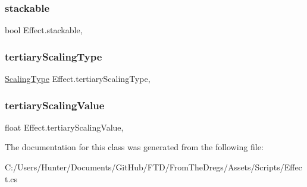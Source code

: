 \mbox{\label{class_effect_a38b8b477fdedcf31c0aea3ecdc64c0c9}} 
\subsubsection{\texorpdfstring{stackable}{stackable}}
{\footnotesize\ttfamily bool Effect.\+stackable\hspace{0.3cm}{\ttfamily [get]}, {\ttfamily [set]}}

\mbox{\label{class_effect_af01f4eaea6040a558e1f3369e28f6bb2}} 
\subsubsection{\texorpdfstring{tertiaryScalingType}{tertiaryScalingType}}
{\footnotesize\ttfamily \mbox{\hyperlink{class_effect_af0ada789de40f58c24c46bf8ed2f300c}{Scaling\+Type}} Effect.\+tertiary\+Scaling\+Type\hspace{0.3cm}{\ttfamily [get]}, {\ttfamily [set]}}

\mbox{\label{class_effect_a92631b7dfe2c5d0bfba281cc8f113159}} 
\subsubsection{\texorpdfstring{tertiaryScalingValue}{tertiaryScalingValue}}
{\footnotesize\ttfamily float Effect.\+tertiary\+Scaling\+Value\hspace{0.3cm}{\ttfamily [get]}, {\ttfamily [set]}}



The documentation for this class was generated from the following file\+:\begin{DoxyCompactItemize}
\item 
C\+:/\+Users/\+Hunter/\+Documents/\+Git\+Hub/\+F\+T\+D/\+From\+The\+Dregs/\+Assets/\+Scripts/Effect.\+cs\end{DoxyCompactItemize}
